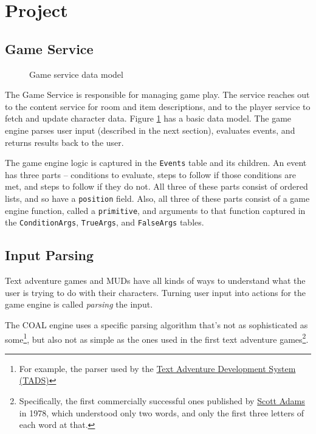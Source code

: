 \documentclass{article}
\newcommand{\enterProblemHeader}[1]{
}
\newcommand{\exitProblemHeader}[1]{
\nobreak\extramarks{#1}{}\nobreak
}
\newcounter{homeworkProblemCounter} %
\newcommand{\homeworkProblemName}{}
\newenvironment{homeworkProblem}[1][Problem \arabic{homeworkProblemCounter}]{ %
\stepcounter{homeworkProblemCounter} %
\renewcommand{\homeworkProblemName}{#1} %
\section{\homeworkProblemName} %
\enterProblemHeader{\homeworkProblemName} %
}{
\exitProblemHeader{\homeworkProblemName} %
}
\newcommand{\homeworkSectionName}{}
\newenvironment{homeworkSection}[1]{ %
\renewcommand{\homeworkSectionName}{#1} %
\subsection{\homeworkSectionName} %
\enterProblemHeader{\homeworkProblemName\ [\homeworkSectionName]} %
}{
\enterProblemHeader{\homeworkProblemName} %
}
\begin{document}
\begin{homeworkProblem}[Project]
\begin{homeworkSection}{Game Service}
\begin{figure}
	\caption{Game service data model}
	\label{fig:game-db}
	\end{figure}

	The Game Service is responsible for managing game play. The service reaches out to the content service for room and item descriptions, and to the player service to fetch and update character data. Figure \ref{fig:game-db} has a basic data model. The game engine parses user input (described in the next section), evaluates events, and returns results back to the user.

	The game engine logic is captured in the \texttt{Events} table and its children. An event has three parts -- conditions to evaluate, steps to follow if those conditions are met, and steps to follow if they do not. All three of these parts consist of ordered lists, and so have a \texttt{position} field. Also, all three of these parts consist of a game engine function, called a \texttt{primitive}, and arguments to that function captured in the \texttt{ConditionArgs}, \texttt{TrueArgs}, and \texttt{FalseArgs} tables.

\end{homeworkSection}

\begin{homeworkSection}{Input Parsing}
	Text adventure games and MUDs have all kinds of ways to understand what the user is trying to do with their characters. Turning user input into actions for the game engine is called \textit{parsing} the input.

	The COAL engine uses a specific parsing algorithm that's not as sophisticated as some\footnote{For example, the parser used by the \href{http://www.tads.org/t2doc/doc/parser.htm}{Text Adventure Development System (TADS)}}, but also not as simple as the ones used in the first text adventure games\footnote{Specifically, the first commercially successful ones published by \href{https://en.wikipedia.org/wiki/Scott_Adams_(game_designer)}{Scott Adams} in 1978, which understood only two words, and only the first three letters of each word at that.}.


\end{homeworkSection}
\end{homeworkProblem}
\end{document}
